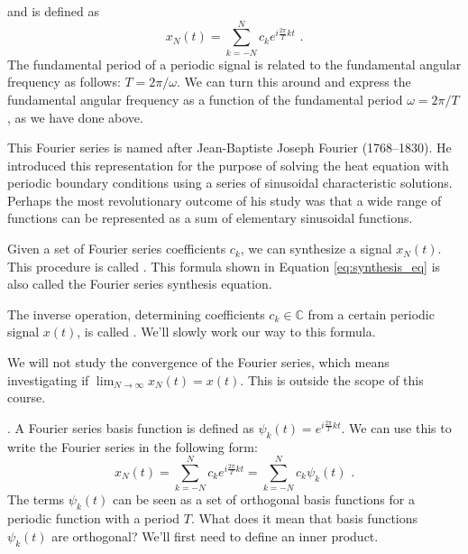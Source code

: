  and is defined as 
\begin{equation}
\boxed{
x_N(t) = \sum_{k=-N}^{N} c_k e^{i \frac{2\pi}{T} k t}
\label{eq:synthesis_eq}
} \,\,.
\end{equation}
The fundamental period of a periodic signal is related to the fundamental angular frequency as follows: $T=2\pi/\omega$. 
We can turn this around and express the fundamental angular frequency as a function of the fundamental period $\omega=2\pi/T$, as we have done above.



This Fourier series is named after Jean-Baptiste Joseph Fourier (1768–1830). He introduced this representation for the purpose of solving the heat equation with periodic boundary conditions using a series of sinusoidal characteristic solutions. Perhaps the most revolutionary outcome of his study was that a wide range of functions can be represented as a sum of elementary sinusoidal functions.

Given a set of Fourier series coefficients $c_k$, we can synthesize a signal $x_N(t)$. This procedure is called \emph{}. 
This formula shown in Equation \ref{eq:synthesis_eq} is also called the Fourier series synthesis equation.

The inverse operation, determining coefficients $c_k \in \mathbb{C}$ from a certain periodic signal $x(t)$, is called \emph{}. 
We'll slowly work our way to this formula.

We will not study the convergence of the Fourier series, which means investigating if $\lim_{N\rightarrow \infty} x_N(t) = x(t)$. This is outside the scope of this course.

. 
A Fourier series basis function is defined as $\psi_k(t)=e^{i\frac{2\pi}{T} k t}$. We can use this to write the Fourier series in the following form:
\begin{equation}
x_N(t) = \sum_{k=-N}^{N} c_k e^{i \frac{2\pi}{T} k t} = \sum_{k=-N}^{N} c_k \psi_k(t) \,\,.
\end{equation}
The terms $\psi_k(t)$ can be seen as a set of orthogonal basis functions for a periodic function with a period $T$. What does it mean that basis functions $\psi_k(t)$ are orthogonal? We'll first need to define an inner product.


